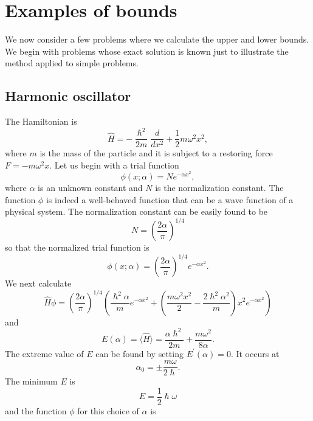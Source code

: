 \documentclass{article}
\numberwithin{equation}{section}
\begin{document}
\section{Examples of bounds}\label{s5}
We now consider a few problems where we calculate the upper and lower
bounds. We begin with problems whose exact solution is known just to
illustrate the method applied to simple problems.
\subsection{Harmonic oscillator}
The Hamiltonian is
\begin{equation}\label{s5e1}
\hat{H} = -\frac{\hslash^2}{2m}\frac{d}{dx^2} + \frac{1}{2}m\omega^2x^2,
\end{equation}
where $m$ is the mass of the particle and it is subject to a restoring
force $F = -m\omega^2 x$. Let us begin with a trial function
\begin{equation}\label{s5e2}
\phi(x;\alpha) = Ne^{-\alpha x^2},
\end{equation}
where $\alpha$ is an unknown constant and $N$ is the normalization constant.
The function $\phi$ is indeed a well-behaved function that can be a wave 
function of a physical system. The normalization constant can be easily
found to be
\[
N = \left(\frac{2\alpha}{\pi}\right)^{1/4}
\]
so that the normalized trial function is
\begin{equation}\label{s5e3}
\phi(x;\alpha) = \left(\frac{2\alpha}{\pi}\right)^{1/4}e^{-\alpha x^2}.
\end{equation}
We next calculate
\begin{equation}\label{s5e4}
\hat{H}\phi = \left(\frac{2\alpha}{\pi}\right)^{1/4}\left(\frac{\hslash^2
\alpha}{m}e^{-\alpha x^2} + \left(\frac{m\omega^2x^2}{2} - \frac{2\hslash^2
\alpha^2}{m}\right)x^2e^{-\alpha x^2}\right)
\end{equation}
and 
\begin{equation}\label{s5e5}
E(\alpha) = \langle\hat{H}\rangle = \frac{\alpha\hslash^2}{2m} + 
\frac{m\omega^2}{8\alpha}.
\end{equation}
The extreme value of $E$ can be found by setting $E^\prime(\alpha) = 0$. It
occurs at
\begin{equation}\label{s5e6}
\alpha_0 = \pm\frac{m\omega}{2\hslash}.
\end{equation}
The minimum $E$ is
\begin{equation}\label{s5e7}
E = \frac{1}{2}\hslash\omega
\end{equation}
and the function $\phi$ for this choice of $\alpha$ is
\end{document}
